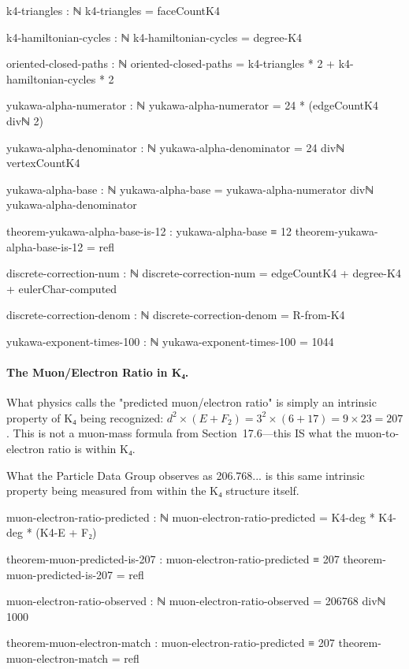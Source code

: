 \documentclass[11pt,a4paper]{book}
\begin{document}
\begin{code}
k4-triangles : ℕ
k4-triangles = faceCountK4

k4-hamiltonian-cycles : ℕ
k4-hamiltonian-cycles = degree-K4
\end{code}

\begin{code}
oriented-closed-paths : ℕ
oriented-closed-paths = k4-triangles * 2 + k4-hamiltonian-cycles * 2

\end{code}

\begin{code}
yukawa-alpha-numerator : ℕ
yukawa-alpha-numerator = 24 * (edgeCountK4 divℕ 2)

yukawa-alpha-denominator : ℕ
yukawa-alpha-denominator = 24 divℕ vertexCountK4

yukawa-alpha-base : ℕ
yukawa-alpha-base = yukawa-alpha-numerator divℕ yukawa-alpha-denominator

theorem-yukawa-alpha-base-is-12 : yukawa-alpha-base ≡ 12
theorem-yukawa-alpha-base-is-12 = refl
\end{code}

\begin{code}
discrete-correction-num : ℕ
discrete-correction-num = edgeCountK4 + degree-K4 + eulerChar-computed

discrete-correction-denom : ℕ
discrete-correction-denom = R-from-K4

yukawa-exponent-times-100 : ℕ
yukawa-exponent-times-100 = 1044


\end{code}

\paragraph{The Muon/Electron Ratio in K₄.}
What physics calls the "predicted muon/electron ratio" is simply an intrinsic property of K₄ being recognized: $d^2 \times (E + F_2) = 3^2 \times (6 + 17) = 9 \times 23 = 207$.
This is not a muon-mass formula from Section~17.6—this IS what the muon-to-electron ratio is within K₄.

What the Particle Data Group observes as 206.768... is this same intrinsic property being measured from within the K₄ structure itself.

\begin{code}
muon-electron-ratio-predicted : ℕ
muon-electron-ratio-predicted = K4-deg * K4-deg * (K4-E + F₂)

theorem-muon-predicted-is-207 : muon-electron-ratio-predicted ≡ 207
theorem-muon-predicted-is-207 = refl

muon-electron-ratio-observed : ℕ
muon-electron-ratio-observed = 206768 divℕ 1000

theorem-muon-electron-match : muon-electron-ratio-predicted ≡ 207
theorem-muon-electron-match = refl
\end{code}
\end{document}
